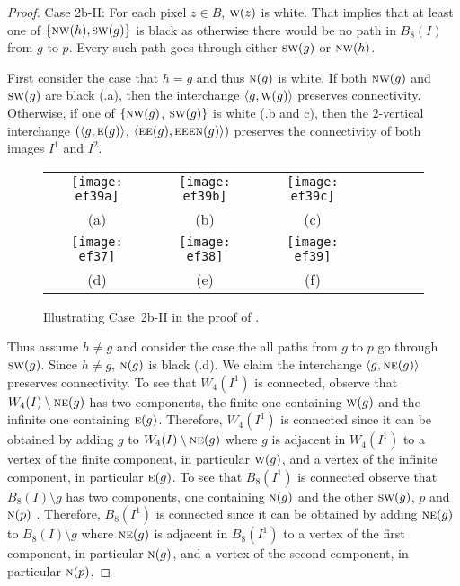 \documentclass[lotsofwhite,charterfonts]{patmorin}
\newcommand{\N}{\textsc{n}}
\newcommand{\NE}{\textsc{ne}}
\newcommand{\E}{\textsc{e}}
\newcommand{\SW}{\textsc{sw}}
\newcommand{\W}{\textsc{w}}
\newcommand{\NW}{\textsc{nw}}
\newcommand{\ic}[2]{\langle #1,#2 \rangle}
\newcommand{\sm}{\ensuremath{\setminus}}
\begin{document}
\begin{proof}
\noindent Case 2b-II: For each pixel $z\in B$, $\W(z)$ is white. That implies that at least one of $\{\NW(h), \SW(g)\}$ is black as otherwise there would be no path in $B_8(I)$ from $g$ to $p$. Every such path goes through either $\SW(g)$ or $\NW(h)$.

First consider the case that  $h=g$ and thus $\N(g)$ is white. If both $\NW(g)$ and $\SW(g)$ are black (.a), then the interchange $\ic{g}{\W(g)}$ preserves connectivity. Otherwise, if one of $\{\NW(g)$, $\SW(g)\}$ is white (.b and c), then the $2$-vertical interchange $(\ic{g}{\E(g)}$, $\ic{\E\E(g)}{\E\E\E\N(g)})$ preserves the connectivity of both images $I^1$ and $I^2$.

\begin{figure}[htbp]
\begin{center}
\begin{tabular}{ccccccc}
\texttt{[image: ef39a]} &
\texttt{[image: ef39b]} &
\texttt{[image: ef39c]} \\
(a) & (b) & (c)  \\
\texttt{[image: ef37]} &
\texttt{[image: ef38]} &
\texttt{[image: ef39]} \\
(d) & (e) & (f) %
\end{tabular}
\end{center}
\caption{Illustrating Case~2b-II in the proof of .}
\end{figure}


Thus assume $h\not=g$ and consider the case the all paths from  $g$ to
$p$ go through $\SW(g)$. Since $h\not=g$, $\N(g)$ is black
(.d). We claim the interchange $\ic{g}{\NE(g)}$
preserves connectivity. To see that $W_4(I^1)$ is connected, observe
that $W_4(I)\sm \NE(g)$ has two components, the finite one containing
$\W(g)$ and the infinite one containing $\E(g)$. Therefore, $W_4(I^1)$
is connected since it can be obtained by adding $g$ to $W_4(I)\sm
\NE(g)$ where $g$ is adjacent in $W_4(I^1)$ to a vertex of the finite
component, in particular $\W(g)$, and a vertex of the infinite
component, in particular $\E(g)$. To see that $B_8(I^1)$ is connected
observe that $B_8(I)\sm g$ has two components, one containing $\N(g)$
and the other $\SW(g)$, $p$ and $\N(p)$ . Therefore, $B_8(I^1)$ is
connected since it can be obtained by adding $\NE(g)$ to $B_8(I)\sm g$
where $\NE(g)$ is adjacent in $B_8(I^1)$ to a vertex of the first
component, in particular $\N(g)$, and a vertex of the second
component, in particular $\N(p)$. 


\end{proof}
\end{document}
